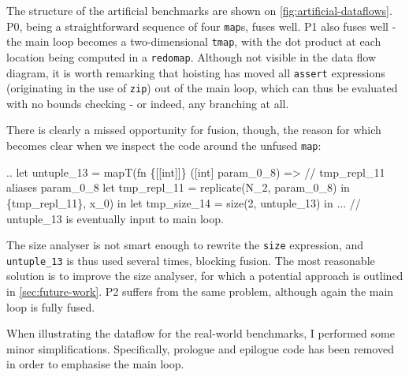The structure of the artificial benchmarks are shown on
\cref{fig:artificial-dataflows}.  P0, being a straightforward sequence
of four \texttt{map}s, fuses well.  P1 also fuses well - the main loop
becomes a two-dimensional \texttt{tmap}, with the dot product at each
location being computed in a \texttt{redomap}.  Although not visible
in the data flow diagram, it is worth remarking that hoisting has
moved all \texttt{assert} expressions (originating in the use of
\texttt{zip}) out of the main loop, which can thus be evaluated with
no bounds checking - or indeed, any branching at all.

There is clearly a missed opportunity for fusion, though, the reason
for which becomes clear when we inspect the code around the unfused
\texttt{map}:
\begin{colorcode}
..
let {untuple_13} =
  mapT(fn \{[[int]]\} ([int] param_0_8) =>
         // tmp_repl_11 aliases param_0_8
         let tmp_repl_11 = replicate(N_2, param_0_8) in
         \{tmp_repl_11\},
       x_0) in
let tmp_size_14 = size(2, untuple_13) in
... // untuple_13 is eventually input to main loop.
\end{colorcode}
The size analyser is not smart enough to rewrite the \texttt{size}
expression, and \texttt{untuple\_13} is thus used several times,
blocking fusion.  The most reasonable solution is to improve the size
analyser, for which a potential approach is outlined in
\cref{sec:future-work}.  P2 suffers from the same problem, although
again the main loop is fully fused.

When illustrating the dataflow for the real-world benchmarks, I
performed some minor simplifications.  Specifically, prologue and
epilogue code has been removed in order to emphasise the main loop.

